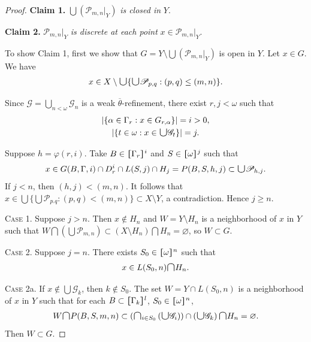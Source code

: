 \documentclass[main.tex]{subfiles}
\begin{document}
\begin{proof}
\textbf{Claim 1.} $\bigcup(\mathscr{P}_{m,n}|_Y)$ \textit{ is closed in} $Y$.

\textbf{Claim 2.}  $\mathscr{P}_{m,n}|_Y$ \textit{is discrete at each point}
  $x \in \mathscr{P}_{m,n}|_Y$.

\noindent To show Claim 1, first we show that $G = Y \setminus \bigcup (\mathscr{P}_{m,n}|_Y)$ 
is open in $Y$. Let $x \in G$. We have 
\begin{gather}
	x \in X \setminus \raisebox{-1pt}{\scalebox{1.5}{$\cup$}} \{\raisebox{-1pt}{\scalebox{1.5}{$\cup$}} \mathscr{P}_{p,q}: (p,q) \le (m,n)\}. \label{eq:5.1.5.1}
\end{gather}

\noindent Since $\mathscr{G} = \bigcup_{n<\omega} \mathscr{G}_n$ is a weak $\overline{\theta}$-refinement, there exist $r, j < \omega$ such that 
\begin{gather*}
	|\{\alpha\in \Gamma_r: x\in G_{r, \alpha}\}| = i > 0, \\
	|\{t\in \omega: x\in \raisebox{-1pt}{\scalebox{1.5}{$\cup$}}\mathscr{G}_t\}| = j. 
\end{gather*}

\noindent Suppose $h = \varphi(r, i)$. Take $B \in \hstretch{1.8}{[}\Gamma_r\hstretch{1.8}{]}^i$ and $S \in \hstretch{1.8}{[}\omega\hstretch{1.8}{]}^j$ 
such that 
$$x \in G(B, \Gamma, i) \cap D_r^i \cap L(S, j) \cap H_j = P(B, S, h, j)\subset
\raisebox{-1pt}{\scalebox{1.5}{$\cup$}}\mathscr{P}_{h, j}.$$
If $j < n$, then $(h, j) < (m, n)$.
It follows that 
$x\in \bigcup\{\bigcup\mathscr{P}_{p. q}: (p, q) < (m, n)\}\subset X\setminus Y$, a contradiction. 
Hence $j \ge n$.

\textsc{Case 1}. Suppose $j > n$. Then $x\notin H_n$ and $W = Y \setminus H_n$ 
is a neighborhood of $x$ in $Y$ such that 
$W \bigcap (\bigcup \mathscr{P}_{m, n})\subset (X\setminus H_n)\bigcap H_n = \varnothing$,
so $W\subset G$.

\textsc{Case 2}. Suppose $j = n$. There exists $S_0\in\hstretch{1.8}{[}\omega\hstretch{1.8}{]}^n$ such that 
\begin{gather}
x\in L(S_0, n) \raisebox{-1pt}{\scalebox{1.5}{$\cap$}} H_n. \label{eq:5.1.5.2}
\end{gather}

\textsc{Case 2}a. 
If $x \notin \bigcup\mathscr{G}_k$, then $k \notin S_0$. The set 
$W = Y\cap L(S_0, n)$ is a neighborhood of $x$ in $Y$ such that 
for each $B\subset \hstretch{1.8}{[}\Gamma_k\hstretch{1.8}{]}^l$, $S_0\in \hstretch{1.8}{[}\omega\hstretch{1.8}{]}^n$,
\begin{gather*}
W\raisebox{-1pt}{\scalebox{1.5}{$\cap$}}  P(B, S, m, n) \subset
  \left( \raisebox{-1pt}{\scalebox{1.5}{$\cap$}}_{i\in S_0} \left(\raisebox{-1pt}{\scalebox{1.5}{$\cup$}} \mathscr{G}_i\right)  \right)
  \cap\left(\raisebox{-1pt}{\scalebox{1.5}{$\cup$}} \mathscr{G}_k\right) 
  \raisebox{-1pt}{\scalebox{1.5}{$\cap$}}  H_n = \varnothing.
\end{gather*}
Then $W\subset G$.


\end{proof}
\end{document}
